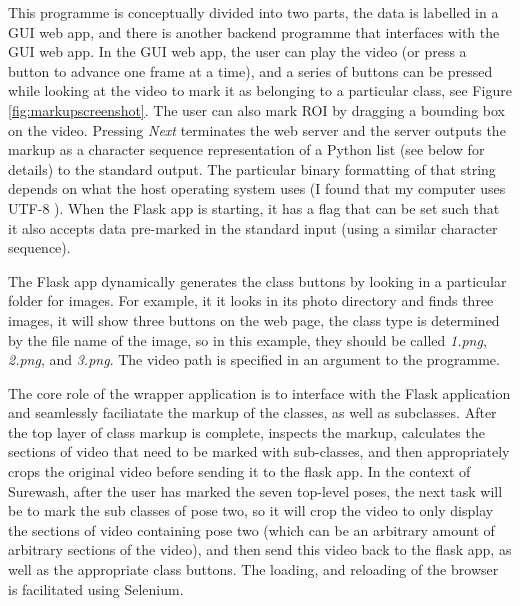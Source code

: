     This programme is conceptually divided into two parts, the data is labelled in a GUI web app, and there is another backend programme that interfaces with the GUI web app. In the GUI web app, the user can play the video (or press a button to advance one frame at a time), and a series of buttons can be pressed while looking at the video to mark it as belonging to a particular class, see Figure \ref{fig:markupscreenshot}. The user can also mark ROI by dragging a bounding box on the video. Pressing {\slshape Next} terminates the web server and the server outputs the markup as a character sequence representation of a Python list (see below for details) to the standard output. The particular binary formatting of that string depends on what the host operating system uses (I found that my computer uses UTF-8 \cite{yergeau1996utf}). When the Flask app is starting, it has a flag that can be set such that it also accepts data pre-marked in the standard input (using a similar character sequence).

    The Flask app dynamically generates the class buttons by looking in a particular folder for images. For example, it it looks in its photo directory and finds three images, it will show three buttons on the web page, the class type is determined by the file name of the image, so in this example, they should be called {\slshape 1.png}, {\slshape 2.png}, and {\slshape 3.png}. The video path is specified in an argument to the programme.

    The core role of the wrapper application is to interface with the Flask application and seamlessly faciliatate the markup of the classes, as well as subclasses. After the top layer of class markup is complete, inspects the markup, calculates the sections of video that need to be marked with sub-classes, and then appropriately crops the original video before sending it to the flask app. In the context of Surewash, after the user has marked the seven top-level poses, the next task will be to mark the sub classes of pose two, so it will crop the video to only display the sections of video containing pose two (which can be an arbitrary amount of arbitrary sections of the video), and then send this video back to the flask app, as well as the appropriate class buttons. The loading, and reloading of the browser is facilitated using Selenium.




